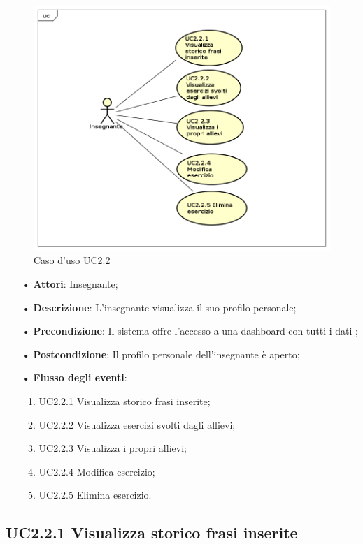 \begin{figure}[H]
\centering
\includegraphics[width=17cm]{img/UC22.png} 
\caption{Caso d'uso UC2.2}
\end{figure}

\begin{itemize}
	\item[•] \textbf{Attori}: Insegnante;
	\item[•] \textbf{Descrizione}: L’insegnante visualizza il suo profilo personale;

	\item[•] \textbf{Precondizione}: Il sistema offre l’accesso a una dashboard con tutti i dati ;

	\item[•] \textbf{Postcondizione}:  Il profilo personale dell’insegnante è aperto;
	\item[•] \textbf{Flusso degli eventi}:
		\begin{enumerate}
			\item UC2.2.1 Visualizza storico frasi inserite;
			\item UC2.2.2 Visualizza esercizi svolti dagli allievi;
			\item UC2.2.3 Visualizza i propri allievi;
			\item UC2.2.4 Modifica esercizio;
			\item UC2.2.5 Elimina esercizio.
		\end{enumerate}
\end{itemize}

\subsection{UC2.2.1  Visualizza storico frasi inserite}

